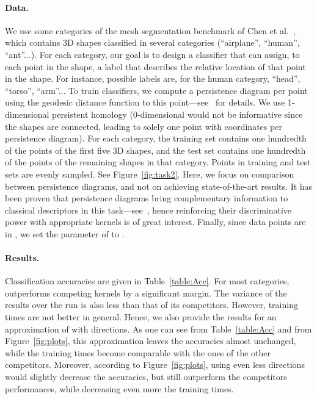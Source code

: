 \documentclass[11pt]{article}
\begin{document}
\paragraph*{Data.}  We use some categories of the mesh segmentation benchmark of Chen et al.~\cite{Chen09},
which contains 3D shapes classified in several categories (``airplane'', ``human'', ``ant''...).
For each category, our goal is to design a classifier that can assign, to each point in the shape,
a label that describes the relative location of that point in the shape. For instance, possible labels are, for the human category, 
``head'', ``torso'', ``arm''...
To train classifiers, we compute a persistence diagram per point using the geodesic distance function to this point---see~\cite{Carriere15a} for details.
We use 1-dimensional persistent homology (0-dimensional would not be informative since the shapes are connected,
leading to solely one point with coordinates  per persistence diagram). 
For each category, the training set contains one hundredth of the points of the first five 3D shapes,
and the test set contains one hundredth of the points of the remaining shapes in that category. Points in
training and test sets are evenly sampled. See Figure~\ref{fig:task2}.
Here, we focus on comparison between persistence diagrams, and not
on achieving state-of-the-art results. It has been proven that persistence diagrams bring complementary information
to classical descriptors in this task---see~\cite{Carriere15a}, 
hence reinforcing their discriminative power with appropriate kernels is of great interest.
Finally, since data points are in , we set the  parameter of  to . 

\paragraph*{Results.} Classification accuracies are given in Table~\ref{table:Acc}.
For most categories,  outperforms competing kernels by a significant margin.
The variance of the results over the run is also less than that of its competitors. 
However, training times are not better in general. 
Hence, we also provide the results for an approximation of  with  directions.
As one can see from Table~\ref{table:Acc} and from Figure~\ref{fig:plots}, this approximation leaves the accuracies almost unchanged, 
while the training times become comparable with the ones of the other competitors. Moreover, 
according to Figure~\ref{fig:plots}, using even less directions
would slightly decrease the accuracies, but still outperform the competitors performances,
while decreasing even more the training times. 
\end{document}

